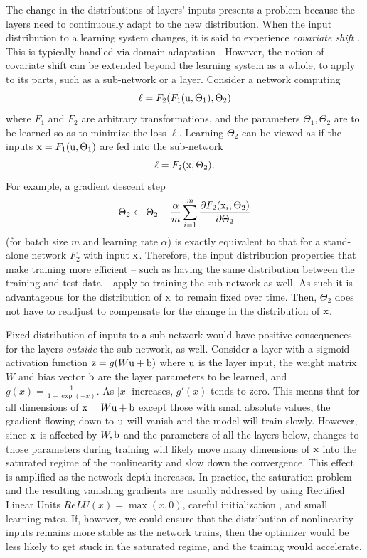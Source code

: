 \documentclass[twocolumn]{article}
\begin{document}
The change in the distributions of layers' inputs presents a problem
because the layers need to continuously adapt to the new
distribution. When the input distribution to a learning system
changes, it is said to experience {\em covariate shift}
\cite{covariate-shift}. This is typically handled via domain
adaptation \cite{domain-adaptation-survey}. However, the notion of
covariate shift can be extended beyond the learning system as a whole,
to apply to its parts, such as a sub-network or a layer. Consider a
network computing $$\ell = F_2(F_1(\mathrm{u}, \Theta_1), \Theta_2)$$ where
$F_1$ and $F_2$ are arbitrary transformations, and the parameters
$\Theta_1, \Theta_2$ are to be learned so as to minimize the loss
$\ell$.  Learning $\Theta_2$ can be viewed as if the inputs
$\mathrm{x}=F_1(\mathrm{u},\Theta_1)$ are fed into the sub-network
$$\ell = F_2(\mathrm{x}, \Theta_2).$$ For example, a gradient descent step
$$\Theta_2\leftarrow \Theta_2 - \frac{\alpha}{m}\sum_{i=1}^m
\frac{\partial F_2(\mathrm{x}_i,\Theta_2)}{\partial \Theta_2}$$ (for batch size $m$ and learning
rate $\alpha$) is exactly equivalent to that for a stand-alone network
$F_2$ with input $\mathrm{x}$.  Therefore, the input distribution properties
that make training more efficient -- such as having the same
distribution between the training and test data -- apply to training
the sub-network as well.  As such it is advantageous for the
distribution of $\mathrm{x}$ to remain fixed over time. Then, $\Theta_2$ does
not have to readjust to compensate for the change in the distribution
of $\mathrm{x}$.

Fixed distribution of inputs to a sub-network would have positive
consequences for the layers {\em outside} the sub-network, as
well. Consider a layer with a sigmoid activation function $\mathrm{z} =
g(W\mathrm{u}+\mathrm{b})$ where $\mathrm{u}$ is the layer input, the weight matrix $W$ and
bias vector $\mathrm{b}$ are the layer parameters to be learned, and $g(x) =
\frac{1}{1+\exp(-x)}$. As $|x|$ increases, $g'(x)$ tends to zero. This
means that for all dimensions of $\mathrm{x}=W\mathrm{u}+\mathrm{b}$ except those with
small absolute values, the gradient flowing down to $\mathrm{u}$ will vanish
and the model will train slowly. However, since $\mathrm{x}$ is affected by
$W, \mathrm{b}$ and the parameters of all the layers below, changes to those
parameters during training will likely move many dimensions of $\mathrm{x}$
into the saturated regime of the nonlinearity and slow down the
convergence. This effect is amplified as the network depth
increases. In practice, the saturation problem and the resulting
vanishing gradients are usually addressed by using Rectified Linear
Units \cite{relu} $ReLU(x)=\max(x,0)$, careful initialization
\cite{glorot-difficulty,iclr-dynamics}, and small learning rates.  If,
however, we could ensure that the distribution of nonlinearity inputs
remains more stable as the network trains, then the optimizer would be
less likely to get stuck in the saturated regime, and the training
would accelerate.
\end{document}
